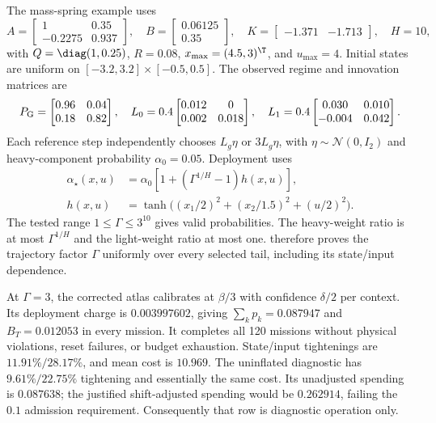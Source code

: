 The mass-spring example uses
\begin{equation}
 A=\begin{bmatrix}1&0.35\\-0.2275&0.937\end{bmatrix},\quad
 B=\begin{bmatrix}0.06125\\0.35\end{bmatrix},\quad
 K=\begin{bmatrix}-1.371&-1.713\end{bmatrix},\quad H=10,
 \label{eq:benchB-system}
\end{equation}
with $Q=\diag(1,0.25)$, $R=0.08$, $x_{\max}=(4.5,3)^\T$, and $u_{\max}=4$. Initial states are uniform on $[-3.2,3.2]\times[-0.5,0.5]$. The observed regime and innovation matrices are
\begin{equation}
 P_{\rm G}=\begin{bmatrix}0.96&0.04\\0.18&0.82\end{bmatrix},\quad
 L_0=0.4\begin{bmatrix}0.012&0\\0.002&0.018\end{bmatrix},\quad
 L_1=0.4\begin{bmatrix}0.030&0.010\\-0.004&0.042\end{bmatrix}.
 \label{eq:numeric-B-noise}
\end{equation}
Each reference step independently chooses $L_g\eta$ or $3L_g\eta$, with $\eta\sim\mathcal N(0,I_2)$ and heavy-component probability $\alpha_0=0.05$. Deployment uses
\begin{align}
 \alpha_\star(x,u)&=\alpha_0[1+(\Gamma^{1/H}-1)h(x,u)],\nonumber\\
 h(x,u)&=\tanh\bigl((x_1/2)^2+(x_2/1.5)^2+(u/2)^2\bigr).
 \label{eq:numeric-B-mixture}
\end{align}
The tested range $1\le\Gamma\le3^{10}$ gives valid probabilities. The heavy-weight ratio is at most $\Gamma^{1/H}$ and the light-weight ratio at most one.  therefore proves the trajectory factor $\Gamma$ uniformly over every selected tail, including its state/input dependence.

At $\Gamma=3$, the corrected atlas calibrates at $\beta/3$ with confidence $\delta/2$ per context. Its deployment charge is $0.003997602$, giving $\sum_kp_k=0.087947$ and $B_T=0.012053$ in every mission. It completes all 120 missions without physical violations, reset failures, or budget exhaustion. State/input tightenings are $11.91\%/28.17\%$, and mean cost is $10.969$. The uninflated diagnostic has $9.61\%/22.75\%$ tightening and essentially the same cost. Its unadjusted spending is $0.087638$; the justified shift-adjusted spending would be $0.262914$, failing the $0.1$ admission requirement. Consequently that row is diagnostic operation only.

